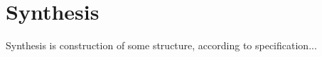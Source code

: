 \chapter{Synthesis}

Synthesis is construction of some structure, according to specification...







